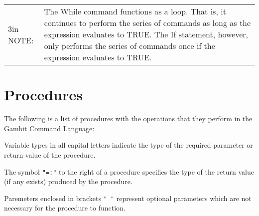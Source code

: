 \begin{tabular}{lp}{3in}
NOTE: & The While command functions as a loop.  That is, it continues
to perform the series of commands as long as the expression
evaluates to TRUE.  The If statement, however, only performs the
series of commands once if the expression evaluates to TRUE.\\
\end{tabular}

\section*{Procedures}

The following is a list of procedures with the operations that they perform
in the Gambit Command Language:

Variable types in all capital letters indicate the type of the required
parameter or return value of the procedure.

The symbol {\tt "=:"} to the right of a procedure specifies the type of the 
return value (if any exists) produced by the procedure.

Paremeters enclosed in brackets {\tt "{ }"} represent optional parameters which
are not necessary for the procedure to function.

